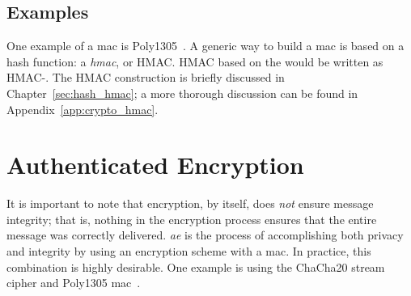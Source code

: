 \subsection{Examples}

One example of a \gls{mac} is Poly1305~\cite{poly1305}.
A generic way to build a \gls{mac} is based on a \gls{hash function}:
a \emph{\gls{hmac}}, or HMAC.
HMAC based on the \ShaTwo{} 
would be written as HMAC-\ShaTwo{}.
The HMAC construction is briefly discussed in Chapter~\ref{sec:hash_hmac};
a more thorough discussion can be found in Appendix~\ref{app:crypto_hmac}.



\section{Authenticated Encryption}
\label{sec:symmetric_ae}

It is important to note that encryption, by itself,
does \emph{not} ensure message integrity;
that is, nothing in the encryption process ensures that
the entire message was correctly delivered.
\emph{\Gls{ae}} is the process of
accomplishing both privacy and integrity
by using an \gls{encryption scheme} with a \gls{mac}.
In practice, this combination is highly desirable.
One example is using the ChaCha20 \gls{stream cipher} and
Poly1305 \gls{mac}~\cite{rfc8439,cryptoeprint:2014:613}.
